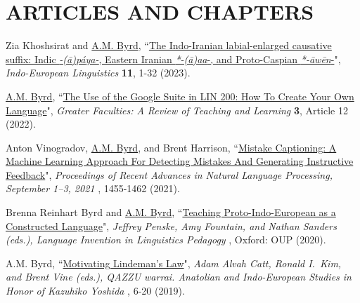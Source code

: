 \documentclass[paper=letter,fontsize=11pt]{scrartcl} %
\newcommand{\NewPart}[2]{\section*{\uppercase{#1} #2}}
\newcommand{\PaperEntry}[7]{
		\noindent #1, ``\href{#7}{#2}", \textit{#3} \textbf{#4}, #5 (#6).}
\begin{document}

\NewPart{Articles and Chapters}{}
\begin{etaremune}


\item \PaperEntry{Zia Khoshsirat and \underline{A.M. Byrd}}{The Indo-Iranian labial-enlarged causative suffix: Indic \textit{-(ā)páya-}, Eastern Iranian \textit{*-(ā)\textsubarch{u}a\textsubarch{i}a}-, and Proto-Caspian \textit{*-\={a}w\={e}n}-}{Indo-European Linguistics}{11}{1-32}{2023}{https://brill.com/view/journals/ieul/aop/article-10.1163-22125892-bja10025/article-10.1163-22125892-bja10025.xml}

\item \PaperEntry{\underline{A.M. Byrd}}{The Use of the Google Suite in LIN 200: How To Create Your Own Language}{Greater Faculties: A Review of Teaching and Learning}{3}{Article 12}{2022}{https://uknowledge.uky.edu/greaterfaculties/vol3/iss1/12}

\item \PaperEntry{Anton Vinogradov, \underline{A.M. Byrd}, and Brent Harrison}{Mistake Captioning: A Machine Learning Approach For Detecting Mistakes And Generating Instructive Feedback}{Proceedings of Recent Advances in Natural Language Processing, September 1--3, 2021}{\hspace{-.35em}}{1455-1462}{2021}{https://ranlp.org/ranlp2021/proceedings-20Sep.pdf}

\item \PaperEntry{Brenna Reinhart Byrd and \underline{A.M. Byrd}}{Teaching Proto-Indo-European as a Constructed Language}{Jeffrey Penske, Amy Fountain, and Nathan Sanders (eds.), Language Invention in Linguistics Pedagogy}{}{Oxford: OUP}{2020}{https://oxford.universitypressscholarship.com/view/10.1093/oso/9780198829874.001.0001/oso-9780198829874-chapter-12}

\item \PaperEntry{A.M. Byrd}{Motivating Lindeman’s Law}{Adam Alvah Catt, Ronald I.~Kim, and Brent Vine (eds.), QAZZU warrai. Anatolian and Indo-European Studies in Honor of Kazuhiko Yoshida}{\hspace{-.35em}}{6-20}{2019}{http://speakingprimal.com/wp-content/uploads/2019/12/Byrd-Motivating-Lindemans-Law.pdf}


\end{etaremune}
\end{document}
